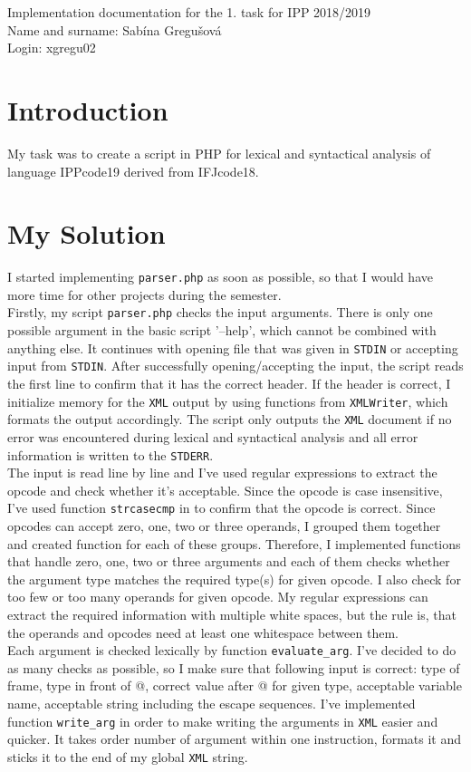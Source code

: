 \documentclass[10pt, a4paper]{article}
\begin{document}
\begin{center}
Implementation documentation for the 1. task for IPP 2018/2019\\
Name and surname: Sabína Gregušová\\
Login: xgregu02
\end{center}

\section*{Introduction}
My task was to create a script in PHP for lexical and syntactical analysis of language IPPcode19 derived from IFJcode18.
\section*{My Solution}
I started implementing \texttt{parser.php} as soon as possible, so that I would have more time for other projects during the semester.
\\

Firstly, my script \texttt{parser.php} checks the input arguments. There is only one possible argument in the basic script '--help', which cannot be combined with anything else. It continues with opening file that was given in \texttt{STDIN} or accepting input from \texttt{STDIN}. After successfully opening/accepting the input, the script reads the first line to confirm that it has the correct header. If the header is correct, I initialize memory for the \texttt{XML} output by using functions from \texttt{XMLWriter}, which formats the output accordingly. The script only outputs the \texttt{XML} document if no error was encountered during lexical and syntactical analysis and all error information is written to the \texttt{STDERR}.
\\

The input is read line by line and I've used regular expressions to extract the opcode and check whether it's acceptable. Since the opcode is case insensitive, I've used function \texttt{strcasecmp} in to confirm that the opcode is correct. Since opcodes can accept zero, one, two or three operands, I grouped them together and created function for each of these groups. Therefore, I implemented functions that handle zero, one, two or three arguments and each of them checks whether the argument type matches the required type(s) for given opcode. I also check for too few or too many operands for given opcode. My regular expressions can extract the required information with multiple white spaces, but the rule is, that the operands and opcodes need at least one whitespace between them.
\\

Each argument is checked lexically by function \texttt{evaluate\_arg}. I've decided to do as many checks as possible, so I make sure that following input is correct: type of frame, type in front of @, correct value after @ for given type, acceptable variable name, acceptable string including the escape sequences. I've implemented function \texttt{write\_arg} in order to make writing the arguments in \texttt{XML} easier and quicker. It takes order number of argument within one instruction, formats it and sticks it to the end of my global \texttt{XML} string.
\end{document}
